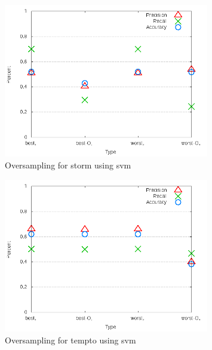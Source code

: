 \begin{figure}[!t]
\centering
\includegraphics[width=0.8\textwidth]{images/svm/test_4/storm_sample_range.png}
\caption{Oversampling for storm using \gls{svm}}
\label{fig:test_4_storm_svm}
\end{figure}

\clearpage
\begin{figure}[!t]
\centering
\includegraphics[width=0.8\textwidth]{images/svm/test_4/tempto_sample_range.png}
\caption{Oversampling for tempto using \gls{svm}}
\label{fig:test_4_tempto_svm}
\end{figure}


